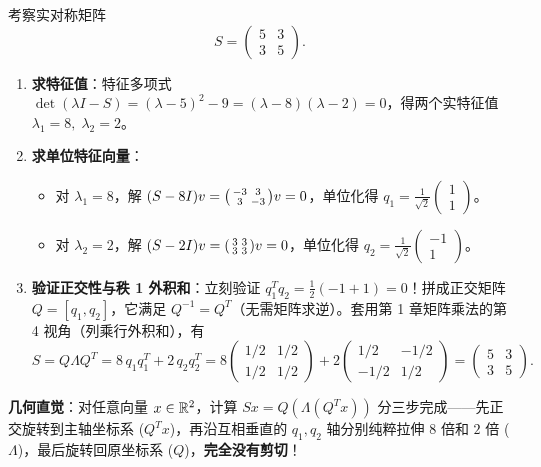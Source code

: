 \begin{example}
\label{ex:ch3-sym2x2}
考察实对称矩阵
\[
  S = \begin{pmatrix} 5 & 3 \\ 3 & 5 \end{pmatrix}.
\]
\begin{enumerate}
  \item \textbf{求特征值}：特征多项式 $\det(\lambda I - S) = (\lambda - 5)^2 - 9 = (\lambda - 8)(\lambda - 2) = 0$，得两个实特征值 $\lambda_1 = 8,\; \lambda_2 = 2$。
  \item \textbf{求单位特征向量}：
    \begin{itemize}
      \item 对 $\lambda_1 = 8$，解 $(S - 8I)v = \begin{psmallmatrix}-3 & 3 \\ 3 & -3\end{psmallmatrix}v = 0$，单位化得 $q_1 = \frac{1}{\sqrt{2}}\begin{pmatrix}1\\1\end{pmatrix}$。
      \item 对 $\lambda_2 = 2$，解 $(S - 2I)v = \begin{psmallmatrix}3 & 3 \\ 3 & 3\end{psmallmatrix}v = 0$，单位化得 $q_2 = \frac{1}{\sqrt{2}}\begin{pmatrix}-1\\1\end{pmatrix}$。
    \end{itemize}
  \item \textbf{验证正交性与秩 1 外积和}：立刻验证 $q_1^T q_2 = \frac{1}{2}(-1+1) = 0$！拼成正交矩阵 $Q = [q_1, q_2]$，它满足 $Q^{-1} = Q^T$（无需矩阵求逆）。套用第 1 章矩阵乘法的第 4 视角（列乘行外积和），有
  \[
    S = Q \Lambda Q^T
      = 8\, q_1 q_1^T + 2\, q_2 q_2^T
      = 8 \begin{pmatrix} 1/2 & 1/2 \\ 1/2 & 1/2 \end{pmatrix}
      + 2 \begin{pmatrix} 1/2 & -1/2 \\ -1/2 & 1/2 \end{pmatrix}
      = \begin{pmatrix} 5 & 3 \\ 3 & 5 \end{pmatrix}.
  \]
\end{enumerate}
\textbf{几何直觉}：对任意向量 $x\in\mathbb{R}^2$，计算 $Sx = Q(\Lambda(Q^T x))$ 分三步完成——先正交旋转到主轴坐标系 ($Q^T x$)，再沿互相垂直的 $q_1, q_2$ 轴分别纯粹拉伸 $8$ 倍和 $2$ 倍 ($\Lambda$)，最后旋转回原坐标系 ($Q$)，\textbf{完全没有剪切}！
\end{example}

